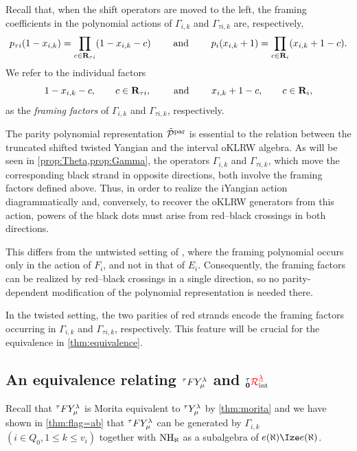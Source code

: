 Recall that, when the shift operators are moved to the left, the
framing coefficients in the polynomial actions of
\(\Gamma_{i,k}\) and \(\Gamma_{\tau i,k}\) are, respectively,
\[
p_{\tau i}(1-x_{i,k})
=
\prod_{c\in\mathbf{R}_{\tau i}}
(1-x_{i,k}-c)
\qquad\text{
and
}\qquad
p_i(x_{i,k}+1)
=
\prod_{c\in\mathbf{R}_i}
(x_{i,k}+1-c).
\]
We refer to the individual factors
\[
1-x_{i,k}-c,
\qquad
c\in\mathbf{R}_{\tau i},
\qquad\text{
and
}\qquad
x_{i,k}+1-c,
\qquad
c\in\mathbf{R}_i,
\]
as the \emph{framing factors} of \(\Gamma_{i,k}\) and
\(\Gamma_{\tau i,k}\), respectively.


\begin{remark}
The parity polynomial representation \(\tilde{\mathcal{P}}^{\mathrm{par}}\) is
essential to the relation between the truncated shifted twisted
Yangian and the interval oKLRW algebra. As will be seen in
\cref{prop:Theta,prop:Gamma}, the operators \(\Gamma_{i,k}\) and
\(\Gamma_{\tau i,k}\), which move the corresponding black strand in
opposite directions, both involve the framing factors defined above.
Thus, in order to realize the iYangian action diagrammatically
and, conversely, to recover the oKLRW generators from this action,
powers of the black dots must arise from red--black crossings in both
directions.

This differs from the untwisted setting of \cite[(4.2b)--(4.2c)]{KTWWY19},
where the framing polynomial occurs only in the action of \(F_i\), and
not in that of \(E_i\). Consequently, the framing factors can be
realized by red--black crossings in a single direction, so no
parity-dependent modification of the polynomial representation is
needed there.

In the twisted setting, the two parities of red strands encode the
framing factors occurring in \(\Gamma_{i,k}\) and
\(\Gamma_{\tau i,k}\), respectively. This feature will be crucial for
the equivalence in \cref{thm:equivalence}.
\end{remark}





\subsection{An equivalence relating ${}^\tau F Y_\mu^\lambda$ and ${{}^\tau_{\mathbf{0}}{\color{red}\mathcal{R}}^{{{\color{red}\underline{\lambda}}}}_{\text{int}}}$}
Recall that ${}^\tau F Y_\mu^\lambda$ is Morita equivalent to ${}^\tau Y_\mu^\lambda$ by \cref{thm:morita} and we have shown in \cref{thm:flag=ab} that ${}^\tau F Y_\mu^\lambda$ can be generated by $\Gamma_{i,k}$ $(i\in Q_0,1\leq k \leq v_i)$ together with $\operatorname{NH}_\aleph$ as a subalgebra of $e(\aleph)\tR e(\aleph)$.

